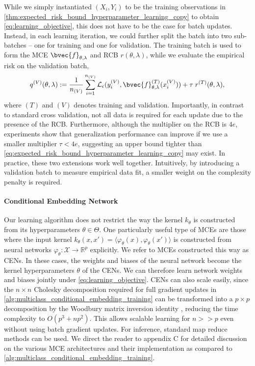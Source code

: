 \documentclass[runningheads, envcountsame, a4paper]{llncs}
\begin{document}
				While we simply instantiated $(X_{i}, Y_{i})$ to be the training observations in \cref{thm:expected_risk_bound_hyperparameter_learning_copy} to obtain \eqref{eq:learning_objective}, this does not have to be the case for batch updates. Instead, in each learning iteration, we could further split the batch into two sub-batches -- one for training and one for validation. The training batch is used to form the \gls{MCE} $\bvec{f}_{\theta, \lambda}$ and \gls{RCB} $r(\theta, \lambda)$, while we evaluate the empirical risk on the validation batch,
				\begin{equation}
					q^{(V)}(\theta, \lambda) := \frac{1}{n_{(V)}} \sum_{i = 1}^{n_{(V)}} \mathcal{L}_{\epsilon}(y^{(V)}_{i}, \bvec{f}^{(T)}_{\theta, \lambda}(x^{(V)}_{i})) + \tau \; r^{(T)}(\theta, \lambda),
				\label{eq:validation_learning_objective}
				\end{equation}
				where $(T)$ and $(V)$ denotes training and validation. Importantly, in contrast to standard cross validation, not all data is required for each update due to the presence of the \gls{RCB}. Furthermore, although the multiplier on the \gls{RCB} is $4 e$, experiments show that generalization performance can improve if we use a smaller multiplier $\tau < 4 e$, suggesting an upper bound tighter than \eqref{eq:expected_risk_bound_hyperparameter_learning_copy} may exist. In practice, these two extensions work well together. Intuitively, by introducing a validation batch to measure empirical data fit, a smaller weight on the complexity penalty is required. 
	
			\paragraph{Conditional Embedding Network}
			
				Our learning algorithm does not restrict the way the kernel $k_{\theta}$ is constructed from its hyperparameters $\theta \in \Theta$. One particularly useful type of \glspl{MCE} are those where the input kernel $k_{\theta}(x, x') = \langle \varphi_{\theta}(x), \varphi_{\theta}(x') \rangle$ is constructed from neural networks $\varphi_{\theta} : \mathcal{X} \to \mathbb{R}^{p}$ explicitly. We refer to \glspl{MCE} constructed this way as \glspl{CEN}. In these cases, the weights and biases of the neural network become the kernel hyperparameters $\theta$ of the \glspl{CEN}. We can therefore learn network weights and biases jointly under \eqref{eq:learning_objective}. \glspl{CEN} can also scale easily, since the $n \times n$ Cholesky decomposition required for full gradient updates in \cref{alg:multiclass_conditional_embedding_training} can be transformed into a $p \times p$ decomposition by the Woodbury matrix inversion identity \citep{higham2002accuracy}, reducing the time complexity to $O(p^{3} + np^{2})$. This allows scalable learning for $n >> p$ even without using batch gradient updates. For inference, standard map reduce methods can be used. We direct the reader to appendix C for detailed discussion on the various \gls{MCE} architectures and their implementation as compared to \cref{alg:multiclass_conditional_embedding_training}. 
				
\end{document}
